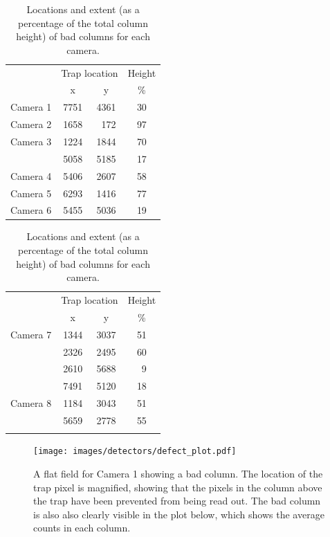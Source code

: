 \begin{colsection}
\begin{table}[t]
    \begin{center}
        \begin{tabular}{c|ccc} %
             & \multicolumn{2}{c}{Trap location} & Height \\
             & x & y & \% \\
            \midrule
            Camera 1 & 7751 & 4361 & 30 \\
            Camera 2 & 1658 & ~172 & 97 \\ %
            Camera 3 & 1224 & 1844 & 70 \\
                     & 5058 & 5185 & 17 \\
            Camera 4 & 5406 & 2607 & 58 \\
            Camera 5 & 6293 & 1416 & 77 \\
            Camera 6 & 5455 & 5036 & 19 \\
        \end{tabular}
        \hspace{0.5cm}
        \begin{tabular}{c|ccc} %
            & \multicolumn{2}{c}{Trap location} & Height \\
            & x & y & \% \\
            \midrule
            Camera 7 & 1344 & 3037 & 51 \\
                     & 2326 & 2495 & 60 \\
                     & 2610 & 5688 & ~9 \\ %
                     & 7491 & 5120 & 18 \\
            Camera 8 & 1184 & 3043 & 51 \\
                     & 5659 & 2778 & 55 \\
            \multicolumn{4}{c}{} \\
        \end{tabular}
    \end{center}
    \caption[Locations of bad columns]{
        Locations and extent (as a percentage of the total column height) of bad columns for each camera.
    }\label{tab:traps}
\end{table}

\begin{figure}[p]
    \begin{center}
        \texttt{[image: images/detectors/defect\_plot.pdf]}
    \end{center}
    \caption[An example of a column defect]{
        A flat field for Camera 1 showing a bad column. The location of the trap pixel is magnified, showing that the pixels in the column above the trap have been prevented from being read out. The bad column is also also clearly visible in the plot below, which shows the average counts in each column.
    }\label{fig:itsatrap}
\end{figure}

\clearpage

\end{colsection}

